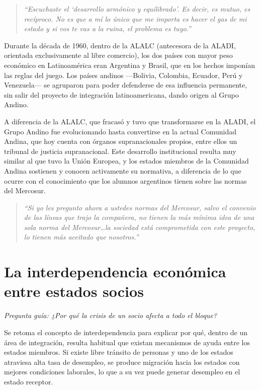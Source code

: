 \documentclass[12pt,oneside]{book}
\newenvironment{citadocente}
  {\begin{quote}\itshape\RaggedRight}
  {\end{quote}}
\begin{document}
\begin{citadocente}
``Escuchaste el `desarrollo armónico y equilibrado'. Es decir, es mutuo, es recíproco. No es que a mí lo único que me importa es hacer el gas de mi estado y si vos te vas a la ruina, el problema es tuyo.''
\end{citadocente}

Durante la década de 1960, dentro de la ALALC (antecesora de la ALADI, orientada exclusivamente al libre comercio), los dos países con mayor peso económico en Latinoamérica eran Argentina y Brasil, que en los hechos imponían las reglas del juego. Los países andinos —Bolivia, Colombia, Ecuador, Perú y Venezuela— se agruparon para poder defenderse de esa influencia permanente, sin salir del proyecto de integración latinoamericana, dando origen al Grupo Andino.

A diferencia de la ALALC, que fracasó y tuvo que transformarse en la ALADI, el Grupo Andino fue evolucionando hasta convertirse en la actual Comunidad Andina, que hoy cuenta con órganos supranacionales propios, entre ellos un tribunal de justicia supranacional. Este desarrollo institucional resulta muy similar al que tuvo la Unión Europea, y los estados miembros de la Comunidad Andina sostienen y conocen activamente su normativa, a diferencia de lo que ocurre con el conocimiento que los alumnos argentinos tienen sobre las normas del Mercosur.

\begin{citadocente}
``Si yo les pregunto ahora a ustedes normas del Mercosur, salvo el convenio de las líneas que trajo la compañera, no tienen la más mínima idea de una sola norma del Mercosur\ldots la sociedad está comprometida con este proyecto, lo tienen más aceitado que nosotros.''
\end{citadocente}

\section{La interdependencia económica entre estados socios}

\textit{Pregunta guía: ¿Por qué la crisis de un socio afecta a todo el bloque?}

Se retoma el concepto de interdependencia para explicar por qué, dentro de un área de integración, resulta habitual que existan mecanismos de ayuda entre los estados miembros. Si existe libre tránsito de personas y uno de los estados atraviesa alta tasa de desempleo, se produce migración hacia los estados con mejores condiciones laborales, lo que a su vez puede generar desempleo en el estado receptor.
\end{document}
